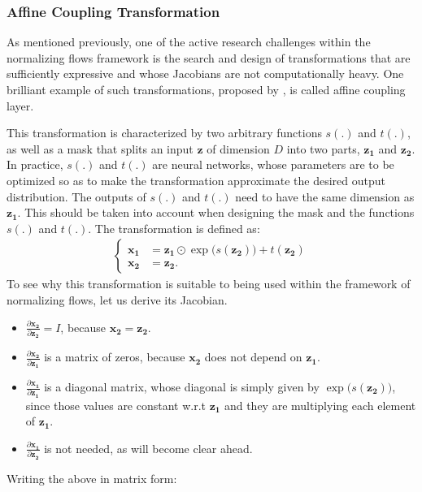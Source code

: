 \subsubsection{Affine Coupling Transformation}
As mentioned previously, one of the active research challenges within the
normalizing flows framework is the search and design of transformations that
are sufficiently expressive and whose Jacobians are not computationally heavy. One brilliant
example of such transformations, proposed by \textcite{real-nvp}, is
called affine coupling layer.

This transformation is characterized by two arbitrary functions $s(.)$ and
$t(.)$, as well as a mask that splits an input $\bm{z}$ of dimension $D$ into
two parts, $\bm{z_1}$ and $\bm{z_2}$. In practice, $s(.)$ and $t(.)$ are neural
networks, whose parameters are to be optimized so as to make the transformation
approximate the desired output distribution. The outputs of $s(.)$ and $t(.)$
need to have the same dimension as $\bm{z_1}$. This should be taken into account when
designing the mask and the functions $s(.)$ and $t(.)$. The transformation is defined as:
\begin{align}
    \begin{cases}
    \bm{x_1} &= \bm{z_1} \odot \exp\big(s(\bm{z_2})\big) + t(\bm{z_2}) \\
    \bm{x_2} &= \bm{z_2}.
    \end{cases}
\end{align}
To see why this transformation is suitable to being used within the framework
of normalizing flows, let us derive its Jacobian.
\begin{itemize}
    \item $\frac{\partial \bm{x_2}}{\partial \bm{z_2}} = I$, because $\bm{x_2} = \bm{z_2}$.
    \item $\frac{\partial \bm{x_2}}{\partial \bm{z_1}}$ is a matrix of zeros, because $\bm{x_2}$ does not depend on $\bm{z_1}$.
    \item $\frac{\partial \bm{x_1}}{\partial \bm{z_1}}$ is a diagonal matrix,
        whose diagonal is simply given by $\exp\big(s(\bm{z_2})\big)$, since those values are
        constant w.r.t $\bm{z_1}$ and they are multiplying each element of $\bm{z_1}$.
    \item $\frac{\partial \bm{x_1}}{\partial \bm{z_2}}$ is not needed,
        as will become clear ahead.
\end{itemize}

Writing the above in matrix form:


